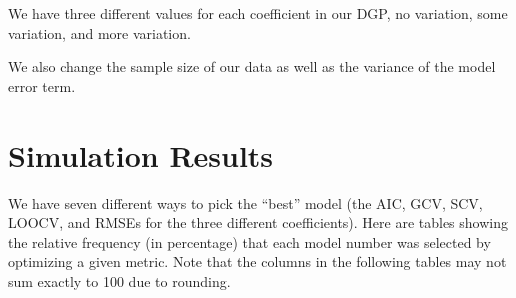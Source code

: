 \documentclass{article}\usepackage[]{graphicx}\usepackage[]{color}
\begin{document}
We have three different values for each coefficient in our DGP, no variation, some variation, and more variation.

We also change the sample size of our data as well as the variance of the model error term.

\section{Simulation Results}

We have seven different ways to pick the ``best'' model (the AIC, GCV, SCV, LOOCV, and RMSEs for the three different coefficients). Here are tables showing the relative frequency (in percentage) that each model number was selected by optimizing a given metric. Note that the columns in the following tables may not sum exactly to 100 due to rounding.
\end{document}
